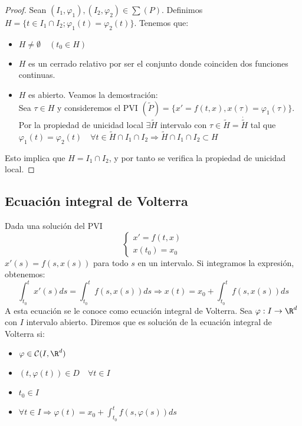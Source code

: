 \documentclass{article}
\begin{document}
\begin{proof}
  Sean $(I_1, \varphi_1), (I_2, \varphi_2) \in \sum (P)$. Definimos
  $H = \{ t \in I_1 \cap I_2; \varphi_1(t) = \varphi_2(t)\}$. Tenemos que:
  \begin{itemize}
  \item $H \neq \emptyset \quad (t_0 \in H)$
  \item $H$ es un cerrado relativo por ser el conjunto donde coinciden dos funciones continuas.
  \item $H$ es abierto. Veamos la demostración:\\
    Sea $\tau \in H$ y consideremos el PVI $(\tilde{P})=\{x'= f(t, x), x(\tau) =
    \varphi_1(\tau)\}$. Por la propiedad de unicidad local $\exists \tilde{H}$ intervalo con
    $\tau \in \tilde{H} = \dot{\tilde{H}}$ tal que
    $\varphi_1(t) = \varphi_2(t) \quad \forall t \in \tilde{H} \cap I_1 \cap I_2 \Rightarrow
    \tilde{H} \cap I_1 \cap I_2 \subset H$
  \end{itemize}
  Esto implica que $H = I_1 \cap I_2$, y por tanto se verifica la propiedad de unicidad local.
\end{proof}

\subsection{Ecuación integral de Volterra}

Dada una solución del PVI
\[
\left\{
  \begin{array}{l}
    x' = f(t,x) \\
    x(t_0) = x_0
  \end{array}
\right.
\]
$x'(s) = f(s,x(s))$ para todo $s$ en un intervalo. Si integramos la
expresión, obtenemos:
$$ \int_{t_0}^t x'(s)ds = \int_{t_0}^tf(s,x(s))ds \Rightarrow x(t) = x_0 + \int_{t_0}^t f(s, x(s))ds $$
A esta ecuación se le conoce como ecuación integral de Volterra. Sea
$\varphi: I \to \R^d$ con $I$ intervalo abierto. Diremos que es
solución de la ecuación integral de Volterra si:

\begin{itemize}
\item $\varphi \in \mathcal{C}(I, \R^d)$
\item $(t, \varphi(t)) \in D \quad \forall t \in I$
\item $t_0 \in I$
\item
  $\forall t \in I \Rightarrow \varphi(t) = x_0 +
  \displaystyle\int_{t_0}^t f(s, \varphi(s))ds$
\end{itemize}
\end{document}
